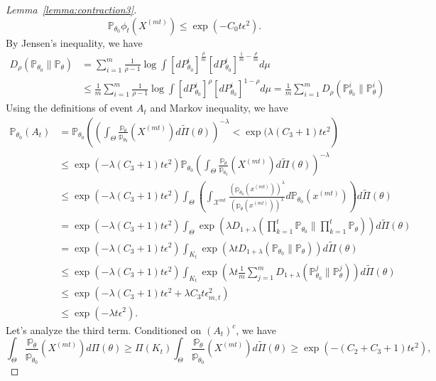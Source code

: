 \documentclass[twoside,11pt]{article}
\numberwithin{equation}{section}
\newcommand\bP{\mathbb{P}}
\newcommand\bp{\mathbb{p}}
\newcommand{\X}{\mathcal{X}}
\begin{document}
{\begin{proof}[Lemma~\ref{lemma:contraction3}]
\begin{equation*}
    \bP_{\theta_0} \phi_t(X^{(mt)})  \leq \exp(-C_0 t \epsilon^2). 
\end{equation*}
By Jensen's inequality, we have
\begin{align*}
   D_\rho(\bP_{\theta_0} \parallel \bP_\theta) &= \sum_{i = 1}^m \frac{1}{\rho - 1} \log \int [dP_{\theta_0}^i]^{\frac{\rho}{m}} [dP_{\theta_0}^i]^{\frac{1}{m} - \frac{\rho}{m}} d \mu \\
   &\leq \frac{1}{m} \sum_{i = 1}^m \frac{1}{\rho - 1} \log \int [dP_{\theta_0}^i]^\rho [dP_{\theta_0}^i]^{1-\rho} d \mu  = \frac{1}{m} \sum_{i = 1}^m  D_\rho(\bP_{\theta_0}^i \parallel \bP_\theta^i) 
\end{align*}
Using the definitions of event $A_t$ and Markov inequality, we have
\begin{align*}
    \bP_{\theta_0} (A_t) &=  \bP_{\theta_0}\left(\left(\int_\Theta \frac{\bp_\theta}{\bp_{\theta_0}}(X^{(mt)}) d \tilde \Pi(\theta) \right)^{-\lambda } < \exp(\lambda(C_3 + 1) t \epsilon^2 \right)  \\
    &\leq \exp(-\lambda (C_3 + 1) t \epsilon^2)  \bP_{\theta_0}\left(\int_\Theta \frac{\bp_\theta}{\bp_{\theta_0}}(X^{(mt)}) d \tilde \Pi(\theta) \right)^{-\lambda } \\
    &\leq \exp(-\lambda(C_3 + 1) t \epsilon^2) \int_\Theta \left( \int_{\X^{mt}}\frac{(\bp_{\theta_0}(x^{(mt)}))^{\lambda }}{(\bp_\theta(x^{(mt)}))^{\lambda } }  d \bP_{\theta_0}(x^{(mt)})\right) d \tilde \Pi(\theta) \\
    &= \exp(-\lambda(C_3 + 1) t \epsilon^2) \int_\Theta \exp(\lambda  D_{1 + \lambda}(\prod_{k = 1}^t  \bP_{\theta_0} \parallel \prod_{k = 1}^t\bP_\theta)) d \tilde \Pi(\theta) \\
    &= \exp(-\lambda(C_3 + 1) t \epsilon^2) \int_{K_t} \exp(\lambda  t  D_{1 + \lambda}(  \bP_{\theta_0} \parallel \bP_\theta)) d \tilde \Pi(\theta) \\
    &\leq \exp(-\lambda(C_3 + 1) t \epsilon^2) \int_{K_t} \exp(\lambda t \frac{1}{m} \sum_{j = 1}^m D_{1 + \lambda}(\bP_{\theta_0}^j \parallel \bP_\theta^j)) d \tilde \Pi(\theta) \\
    &\leq \exp(- \lambda(C_3 + 1) t \epsilon^2 + \lambda C_3 t \epsilon_{m,t}^2) \\
    &\leq \exp(-\lambda t \epsilon^2). 
\end{align*}
Let's analyze the third term. Conditioned on $(A_t)^c$, we have
\begin{equation*}
\int_{\Theta} \frac{\bp_\theta}{\bp_{\theta_0}}(X^{(mt)}) d \Pi(\theta) \geq \Pi(K_t)  \int_{\Theta} \frac{\bp_\theta}{\bp_{\theta_0}}(X^{(mt)}) d \tilde \Pi(\theta)  \geq \exp(-(C_2 + C_3 + 1) t \epsilon^2), 

\end{equation*}
\end{proof}}
\end{document}
